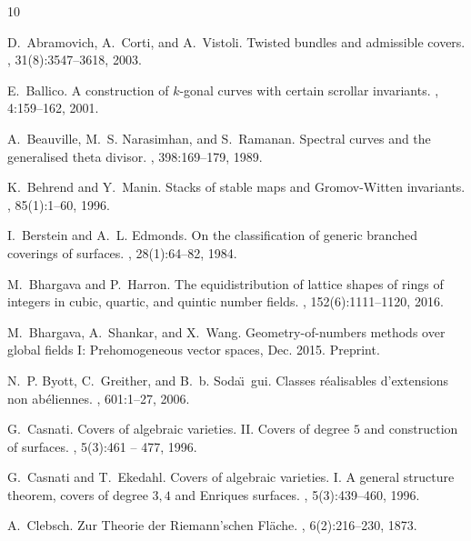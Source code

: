 \documentclass[11 pt]{amsart}
\numberwithin{equation}{section}
\begin{document}
\def\cprime{$'$}
\begin{thebibliography}{10}

D.~Abramovich, A.~Corti, and A.~Vistoli.
\newblock Twisted bundles and admissible covers.
, 31(8):3547--3618, 2003.

E.~Ballico.
\newblock A construction of {$k$}-gonal curves with certain scrollar
  invariants.
, 4:159--162, 2001.

A.~Beauville, M.~S. Narasimhan, and S.~Ramanan.
\newblock Spectral curves and the generalised theta divisor.
, 398:169--179, 1989.

K.~Behrend and Y.~Manin.
\newblock Stacks of stable maps and {G}romov-{W}itten invariants.
, 85(1):1--60, 1996.

I.~Berstein and A.~L. Edmonds.
\newblock On the classification of generic branched coverings of surfaces.
, 28(1):64--82, 1984.

M.~Bhargava and P.~Harron.
\newblock The equidistribution of lattice shapes of rings of integers in cubic,
  quartic, and quintic number fields.
, 152(6):1111--1120, 2016.

M.~{Bhargava}, A.~{Shankar}, and X.~{Wang}.
\newblock Geometry-of-numbers methods over global fields {I}: Prehomogeneous
  vector spaces, Dec. 2015.
\newblock Preprint.

N.~P. Byott, C.~Greither, and B.~b. Soda\"\i~gui.
\newblock Classes r\'ealisables d'extensions non ab\'eliennes.
, 601:1--27, 2006.

G.~Casnati.
\newblock Covers of algebraic varieties. {II}. {C}overs of degree {$5$} and
  construction of surfaces.
, 5(3):461 -- 477, 1996.

G.~Casnati and T.~Ekedahl.
\newblock Covers of algebraic varieties. {I}. {A} general structure theorem,
  covers of degree {$3,4$} and {E}nriques surfaces.
, 5(3):439--460, 1996.

A.~Clebsch.
\newblock Zur {T}heorie der {R}iemann'schen {F}l\"ache.
, 6(2):216--230, 1873.


\end{thebibliography}
\end{document}
